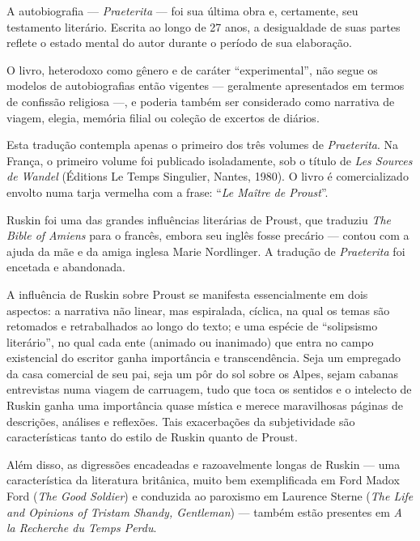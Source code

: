 A autobiografia --- \emph{Praeterita} --- foi sua última obra e,
certamente, seu testamento literário. Escrita ao longo de 27 anos, a
desigualdade de suas partes reflete o estado mental do autor durante o
período de sua elaboração.

O livro, heterodoxo como gênero e de caráter ``experimental'', não segue
os modelos de autobiografias então vigentes --- geralmente apresentados
em termos de confissão religiosa ---, e poderia também ser considerado
como narrativa de viagem, elegia, memória filial ou coleção de excertos
de diários.

Esta tradução contempla apenas o primeiro dos três volumes de
\emph{Praeterita}. Na França, o primeiro volume foi publicado
isoladamente, sob o título de \emph{Les Sources de Wandel} (Éditions Le
Temps Singulier, Nantes, 1980). O livro é comercializado envolto numa
tarja vermelha com a frase: ``\emph{Le Maître de Proust}''.

Ruskin foi uma das grandes influências literárias de Proust, que
traduziu \emph{The Bible of Amiens} para o francês, embora seu inglês
fosse precário --- contou com a ajuda da mãe e da amiga inglesa Marie
Nordlinger. A tradução de \emph{Praeterita} foi encetada e abandonada.

A influência de Ruskin sobre Proust se manifesta essencialmente em dois
aspectos: a narrativa não linear, mas espiralada, cíclica, na qual os
temas são retomados e retrabalhados ao longo do texto; e uma espécie de
``solipsismo literário'', no qual cada ente (animado ou inanimado) que
entra no campo existencial do escritor ganha importância e
transcendência. Seja um empregado da casa comercial de seu pai, seja um
pôr do sol sobre os Alpes, sejam cabanas entrevistas numa viagem de
carruagem, tudo que toca os sentidos e o intelecto de Ruskin ganha uma
importância quase mística e merece maravilhosas páginas de descrições,
análises e reflexões. Tais exacerbações da subjetividade são
características tanto do estilo de Ruskin quanto de Proust.

Além disso, as digressões encadeadas e razoavelmente longas de Ruskin ---
uma característica da literatura britânica, muito bem exemplificada em
Ford Madox Ford (\emph{The Good Soldier}) e conduzida ao paroxismo em
Laurence Sterne (\emph{The Life and Opinions of Tristam Shandy,
Gentleman}) --- também estão presentes em \emph{A la Recherche du Temps
Perdu}.


